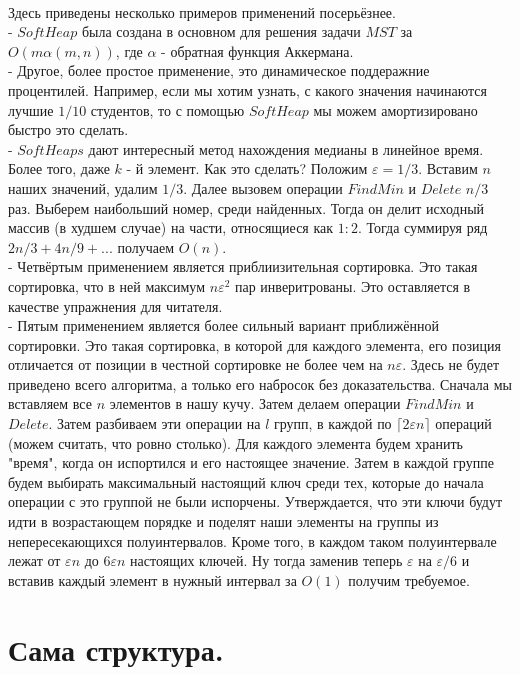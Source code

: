 \documentclass{article}
\begin{document}
		\paragraph{}
		Здесь приведены несколько примеров применений посерьёзнее.\\
		- $SoftHeap$ была создана в основном для решения задачи $MST$ за $O(m\alpha(m,n))$, где $\alpha$ - обратная функция Аккермана.\\
		- Другое, более простое применение, это динамическое поддеражние процентилей. Например, если мы хотим узнать, с какого значения начинаются лучшие $1/10$ студентов, то с помощью $SoftHeap$ мы можем амортизировано быстро это сделать.\\
		- $SoftHeaps$ дают интересный метод нахождения медианы в линейное время. Более того, даже $k$ - й элемент. Как это сделать? Положим $\varepsilon = 1/3$. Вставим $n$ наших значений, удалим $1/3$. Далее вызовем операции $FindMin$ и $Delete$ $n/3$ раз. Выберем наибольший номер, среди найденных. Тогда он делит исходный массив (в худшем случае) на части, относящиеся как $1:2$. Тогда суммируя ряд $2n/3 + 4n/9 + ...$ получаем $O(n)$.\\
		- Четвёртым применением является приблиизительная сортировка. Это такая сортировка, что в ней максимум $n\varepsilon^2$ пар инверитрованы. Это оставляется в качестве упражнения для читателя.\\
		- Пятым применением является более сильный вариант приближённой сортировки. Это такая сортировка, в которой для каждого элемента, его позиция отличается от позиции в честной сортировке не более чем на $n\varepsilon$. Здесь не будет приведено всего алгоритма, а только его набросок без доказательства. Сначала мы вставляем все $n$ элементов в нашу кучу. Затем делаем операции $FindMin$ и $Delete$. Затем разбиваем эти операции на $l$ групп,  в каждой по $\lceil 2\varepsilon n\rceil$ операций (можем считать, что ровно столько). Для каждого элемента будем хранить "время", когда он испортился и его настоящее значение. Затем в каждой группе будем выбирать максимальный настоящий ключ среди тех, которые до начала операции с  это группой не были испорчены. Утверждается, что эти ключи будут идти в возрастающем порядке и поделят наши элементы на группы из непересекающихся полуинтервалов. Кроме того, в каждом таком полуинтервале лежат от $\varepsilon n$ до $6\varepsilon n$ настоящих ключей. Ну тогда заменив теперь $\varepsilon$ на $\varepsilon / 6$ и вставив каждый элемент в нужный интервал за $O(1)$ получим требуемое.
	\section{Сама структура.}
\end{document}
